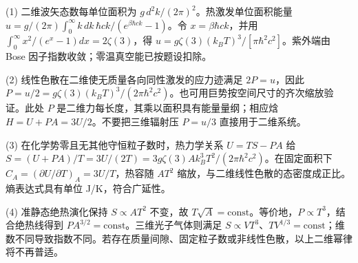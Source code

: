 (1) 二维波矢态数每单位面积为 \(g\,d^2k/(2\pi)^2\)。热激发单位面积能量 \(u=g/(2\pi)\int_0^\infty k\,dk\,\hbar ck/(e^{\beta\hbar ck}-1)\)。令 \(x=\beta\hbar ck\)，并用 \(\int_0^\infty x^2/(e^x-1)dx=2\zeta(3)\)，得 \(u=g\zeta(3)(k_BT)^3/[\pi\hbar^2c^2]\)。紫外端由 Bose 因子指数收敛；零温真空能已按题设扣除。

(2) 线性色散在二维使无质量各向同性激发的应力迹满足 \(2P=u\)，因此 \(P=u/2=g\zeta(3)(k_BT)^3/(2\pi\hbar^2c^2)\)。也可用巨势按空间尺寸的齐次缩放验证。此处 \(P\) 是二维力每长度，其乘以面积具有能量量纲；相应焓 \(H=U+PA=3U/2\)。不要把三维辐射压 \(P=u/3\) 直接用于二维系统。

(3) 在化学势零且无其他守恒粒子数时，热力学关系 \(U=TS-PA\) 给 \(S=(U+PA)/T=3U/(2T)=3g\zeta(3)Ak_B^3T^2/(2\pi\hbar^2c^2)\)。在固定面积下 \(C_A=(\partial U/\partial T)_A=3U/T\)，热容随 \(AT^2\) 缩放，与二维线性色散的态密度成正比。熵表达式具有单位 J/K，符合广延性。

(4) 准静态绝热演化保持 \(S\propto AT^2\) 不变，故 \(T\sqrt A=\mathrm{const}\)。等价地，\(P\propto T^3\)，结合绝热线得到 \(PA^{3/2}=\mathrm{const}\)。三维光子气体则满足 \(S\propto VT^3\)、\(TV^{1/3}=\mathrm{const}\)；维数不同导致指数不同。若存在质量间隙、固定粒子数或非线性色散，以上二维幂律将不再普适。
